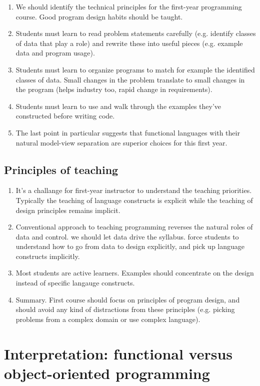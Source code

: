 \documentclass{article}
\begin{document}
\begin{enumerate}
\item We should identify the technical principles for the first-year
  programming course. Good program design habits should be taught.
\item Students must learn to read problem statements carefully
  (e.g. identify classes of data that play a role) and rewrite these
  into useful pieces (e.g. example data and program usage).
\item Students must learn to organize programs to match for example
  the identified classes of data. Small changes in the problem
  translate to small changes in the program (helps industry too, rapid
  change in requirements).
\item Students must learn to use and walk through the examples they've
  constructed before writing code.
\item The last point in particular suggests that functional languages
  with their natural model-view separation are superior choices for
  this first year.
\end{enumerate}
  
\subsection{Principles of teaching}

\begin{enumerate}
\item It's a challange for first-year instructor to understand the
  teaching priorities. Typically the teaching of language constructs
  is explicit while the teaching of design principles remains
  implicit.
\item Conventional approach to teaching programming reverses the
  natural roles of data and control. we should let data drive the
  syllabus. force students to understand how to go from data to design
  explicitly, and pick up language constructs implicitly.
\item Most students are active learners. Examples should concentrate
  on the design instead of specific langauge constructs.
\item Summary. First course should focus on principles of program
  design, and should avoid any kind of distractions from these
  principles (e.g. picking problems from a complex domain or use
  complex language).
\end{enumerate}

\section{Interpretation: functional versus object-oriented programming}
\end{document}
